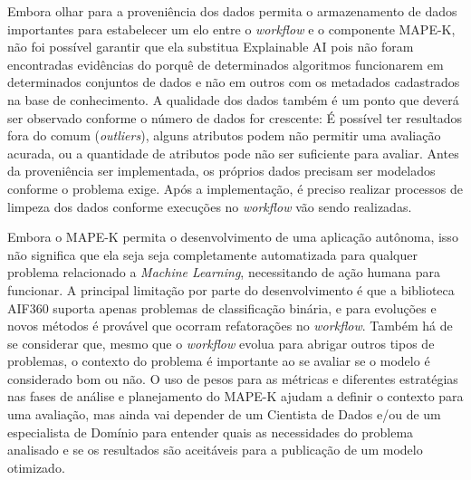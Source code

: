 \documentclass{article}
\begin{document}
Embora olhar para a proveniência dos dados permita o armazenamento de dados importantes para estabelecer um elo entre o \textit{workflow} e o componente MAPE-K, não foi possível garantir que ela substitua Explainable AI pois não foram encontradas evidências do porquê de determinados algoritmos funcionarem em determinados conjuntos de dados e não em outros com os metadados cadastrados na base de conhecimento. A qualidade dos dados também é um ponto que deverá ser observado conforme o número de dados for crescente: É possível ter resultados fora do comum (\textit{outliers}), alguns atributos podem não permitir uma avaliação acurada, ou a quantidade de atributos pode não ser suficiente para avaliar. Antes da proveniência ser implementada, os próprios dados precisam ser modelados conforme o problema exige. Após a implementação, é preciso realizar processos de limpeza dos dados conforme execuções no \textit{workflow} vão sendo realizadas.

Embora o MAPE-K permita o desenvolvimento de uma aplicação autônoma, isso não significa que ela seja seja completamente automatizada para qualquer problema relacionado a \textit{Machine Learning}, necessitando de ação humana para funcionar. A principal limitação por parte do desenvolvimento é que a biblioteca AIF360 suporta apenas problemas de classificação binária, e para evoluções e novos métodos é provável que ocorram refatorações no \textit{workflow}. Também há de se considerar que, mesmo que o \textit{workflow} evolua para abrigar outros tipos de problemas, o contexto do problema é importante ao se avaliar se o modelo é considerado bom ou não. O uso de pesos para as métricas e diferentes estratégias nas fases de análise e planejamento do MAPE-K ajudam a definir o contexto para uma avaliação, mas ainda vai depender de um Cientista de Dados e/ou de um especialista de Domínio para entender quais as necessidades do problema analisado e se os resultados são aceitáveis para a publicação de um modelo otimizado.



\end{document}
